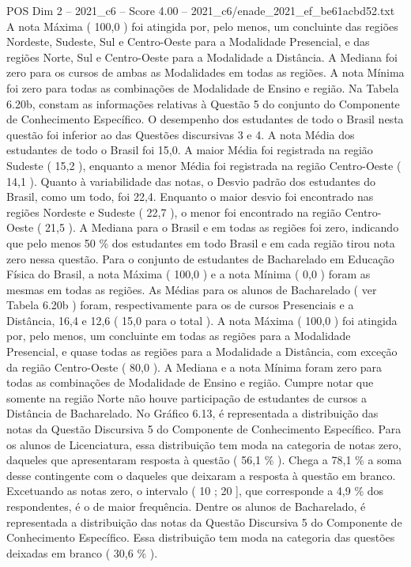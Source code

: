 \begin{textsample}{POS Dim 2 – 2021\_c6 – Score 4.00 – 2021\_c6/enade\_2021\_ef\_be61acbd52.txt}
A nota Máxima ( 100,0 ) foi atingida por, pelo menos, um concluinte das regiões Nordeste, Sudeste, Sul e Centro-Oeste para a Modalidade Presencial, e das regiões Norte, Sul e Centro-Oeste para a Modalidade a Distância.
A Mediana foi zero para os cursos de ambas as Modalidades em todas as regiões.
A nota Mínima foi zero para todas as combinações de Modalidade de Ensino e região.
Na Tabela 6.20b, constam as informações relativas à Questão 5 do conjunto do Componente de Conhecimento Específico.
O desempenho dos estudantes de todo o Brasil nesta questão foi inferior ao das Questões discursivas 3 e 4.
A nota Média dos estudantes de todo o Brasil foi 15,0.
A maior Média foi registrada na região Sudeste ( 15,2 ), enquanto a menor Média foi registrada na região Centro-Oeste ( 14,1 ).
Quanto à variabilidade das notas, o Desvio padrão dos estudantes do Brasil, como um todo, foi 22,4.
Enquanto o maior desvio foi encontrado nas regiões Nordeste e Sudeste ( 22,7 ), o menor foi encontrado na região Centro-Oeste ( 21,5 ).
A Mediana para o Brasil e em todas as regiões foi zero, indicando que pelo menos 50 \% dos estudantes em todo Brasil e em cada região tirou nota zero nessa questão.
Para o conjunto de estudantes de Bacharelado em Educação Física do Brasil, a nota Máxima ( 100,0 ) e a nota Mínima ( 0,0 ) foram as mesmas em todas as regiões.
As Médias para os alunos de Bacharelado ( ver Tabela 6.20b ) foram, respectivamente para os de cursos Presenciais e a Distância, 16,4 e 12,6 ( 15,0 para o total ).
A nota Máxima ( 100,0 ) foi atingida por, pelo menos, um concluinte em todas as regiões para a Modalidade Presencial, e quase todas as regiões para a Modalidade a Distância, com exceção da região Centro-Oeste ( 80,0 ).
A Mediana e a nota Mínima foram zero para todas as combinações de Modalidade de Ensino e região.
Cumpre notar que somente na região Norte não houve participação de estudantes de cursos a Distância de Bacharelado.
No Gráfico 6.13, é representada a distribuição das notas da Questão Discursiva 5 do Componente de Conhecimento Específico.
Para os alunos de Licenciatura, essa distribuição tem moda na categoria de notas zero, daqueles que apresentaram resposta à questão ( 56,1 \% ).
Chega a 78,1 \% a soma desse contingente com o daqueles que deixaram a resposta à questão em branco.
Excetuando as notas zero, o intervalo ( 10 ; 20 ], que corresponde a 4,9 \% dos respondentes, é o de maior frequência.
Dentre os alunos de Bacharelado, é representada a distribuição das notas da Questão Discursiva 5 do Componente de Conhecimento Específico.
Essa distribuição tem moda na categoria das questões deixadas em branco ( 30,6 \% ).

\end{textsample}
